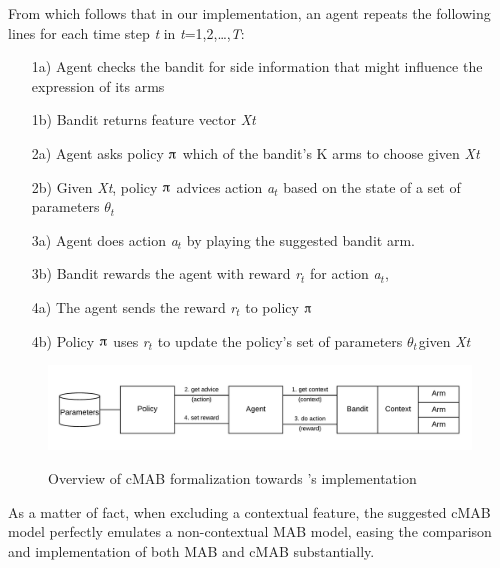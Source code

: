 \documentclass[nojss]{jss}\usepackage[]{graphicx}\usepackage[]{color}
\begin{document}
From which follows that in our implementation, an agent repeats the following lines for each time step \textit{t} in \textit{t}=1,2,{\dots},\textit{T}:

\begin{enumerate}
         \item[1a)] Agent checks the bandit for side information that might influence the expression of its arms
         \item[1b)] Bandit returns feature vector \textit{Xt }
         \item[2a)] Agent asks policy $\piup$ which of the bandit's K arms to choose given \textit{Xt}
         \item[2b)] Given \textit{Xt}, policy $\piup$ advices action \textit{a${}_{t}$} based on the state of a set of parameters \textit{$\theta$${}_{t}$${}_{  }$}
         \item[3a)] Agent does action \textit{a${}_{t}$} by playing the suggested bandit arm.
         \item[3b)] Bandit rewards the agent with reward \textit{r${}_{t}$ }for action \textit{a${}_{t}$},
         \item[4a)] The agent sends the reward\textit{ r${}_{t}$ }to policy $\piup$
         \item[4b)] Policy $\piup$ uses \textit{r${}_{t}$} to update the policy's set of parameters\textit{ $\theta$${}_{t}$${}_{  }$}given \textit{Xt}
\end{enumerate}

\begin{figure}[H]
  \centering
    \includegraphics[width=.99\textwidth]{fig/cmab_chart}
    \label{fig:cmab_chart}
      \caption{Overview of cMAB formalization towards 's implementation}
\end{figure}

As a matter of fact, when excluding a contextual feature, the suggested cMAB model perfectly emulates a non-contextual MAB model, easing the comparison and implementation of both MAB and cMAB substantially.
\end{document}
